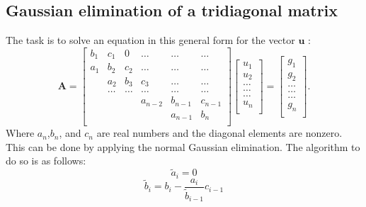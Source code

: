 \documentclass[10pt,a4paper]{article}
\begin{document}
\subsection{Gaussian elimination of a tridiagonal matrix} 
The task is to solve an equation in this general form for the vector $\mathbf{u}$ :\\
\[
    \mathbf{A} = \begin{bmatrix}
                           b_1& c_1 & 0 &\dots   & \dots &\dots \\
                           a_1 & b_2 & c_2 &\dots &\dots &\dots \\
                           & a_2 & b_3 & c_3 & \dots & \dots \\
                           & \dots   & \dots &\dots   &\dots & \dots \\
                           &   &  &a_{n-2}  &b_{n-1}& c_{n-1} \\
                           &    &  &   &a_{n-1} & b_n \\
                      \end{bmatrix}\begin{bmatrix}
                           u_1\\
                           u_2\\
                           \dots \\
                          \dots  \\
                          \dots \\
                           u_n\\
                      \end{bmatrix}
  =\begin{bmatrix}
                           {g}_1\\
                           {g}_2\\
                           \dots \\
                           \dots \\
                          \dots \\
                           {g}_n\\
                      \end{bmatrix}.
\]
Where $a_n$,$b_n$, and $c_n$ are real numbers and the diagonal elements are nonzero.\\
This can be done by applying the normal Gaussian elimination. The algorithm to do so is as follows:
$$\tilde{a}_i = 0$$
$$\tilde{b}_i=b_i-\frac{a_i}{\tilde{b}_{i-1}} c_{i-1}$$
\end{document}
